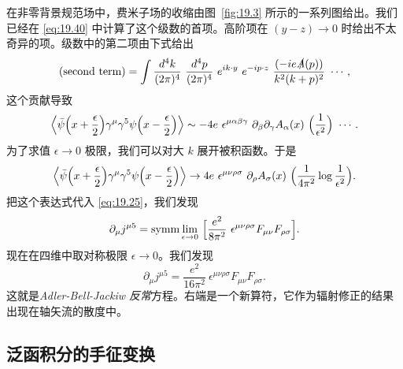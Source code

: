 在非零背景规范场中，费米子场的收缩由图~\ref{fig:19.3} 所示的一系列图给出。我们已经在 \eqref{eq:19.40} 中计算了这个级数的首项。高阶项在 $(y-z)\to 0$ 时给出不太奇异的项。级数中的第二项由下式给出
\begin{equation}
  \text{(second term)} = \int \frac{d^4k}{(2\pi)^4}\ \frac{d^4p}{(2\pi)^4}\
    e^{ik\cdot y}\ e^{-ip\cdot z}\ \frac{(-ie\slashed{A}(p))}{k^2(k+p)^2}
    \ \cdots ,
  \label{eq:19.41}
\end{equation}
这个贡献导致
\begin{equation}
  \Bigl\langle \bar{\psi}\Bigl( x+\frac{\epsilon}{2} \Bigr)\gamma^\mu\gamma^5
    \psi\Bigl( x-\frac{\epsilon}{2} \Bigr) \Bigr\rangle
  \sim -4e\ \epsilon^{\mu\alpha\beta\gamma}\ \partial_\beta
    \partial_\gamma A_\alpha(x)\ \Bigl( \frac{1}{\epsilon^2} \Bigr)\ \cdots .
  \label{eq:19.42}
\end{equation}
为了求值 $\epsilon\to 0$ 极限，我们可以对大 $k$ 展开被积函数。于是
\begin{equation}
  \Bigl\langle \bar{\psi}\Bigl( x+\frac{\epsilon}{2} \Bigr)\gamma^\mu\gamma^5
    \psi\Bigl( x-\frac{\epsilon}{2} \Bigr) \Bigr\rangle
  \to 4e\ \epsilon^{\mu\nu\rho\sigma}\ \partial_\rho A_\sigma(x)\ \Bigl(
    \frac{1}{4\pi^2}\log\frac{1}{\epsilon^2} \Bigr) .
  \label{eq:19.43}
\end{equation}
把这个表达式代入 \eqref{eq:19.25}，我们发现
\begin{equation}
  \partial_\mu j^{\mu 5} = \mathrm{symm}\lim_{\epsilon\to 0}\ \Bigl[
    \frac{e^2}{8\pi^2}\ \epsilon^{\mu\nu\rho\sigma}F_{\mu\nu}F_{\rho\sigma}
    \Bigr] .
  \label{eq:19.44}
\end{equation}
现在在四维中取对称极限 $\epsilon\to 0$。我们发现
\begin{equation}
  \partial_\mu j^{\mu 5} = \frac{e^2}{16\pi^2}\ \epsilon^{\mu\nu\rho\sigma}
    F_{\mu\nu}F_{\rho\sigma} .
  \label{eq:19.45}
\end{equation}
这就是\emph{Adler-Bell-Jackiw 反常}方程。右端是一个新算符，它作为辐射修正的结果出现在轴矢流的散度中。

\subsection{泛函积分的手征变换}

